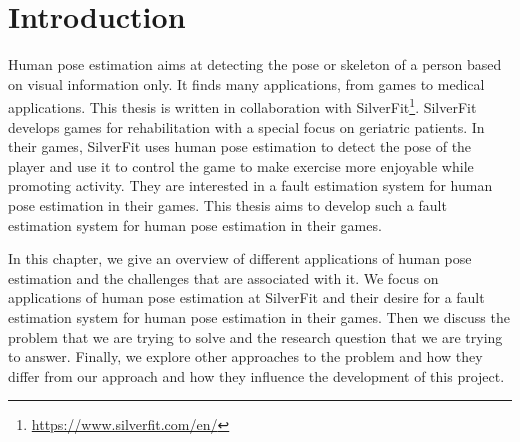 \chapter{Introduction}
\setcounter{page}{1}

Human pose estimation aims at detecting the pose or skeleton of a person based on visual information only. It finds many applications, from games to medical applications. This thesis is written in collaboration with SilverFit\footnote{\url{https://www.silverfit.com/en/}}. SilverFit develops games for rehabilitation with a special focus on geriatric patients. In their games, SilverFit uses human pose estimation to detect the pose of the player and use it to control the game to make exercise more enjoyable while promoting activity. They are interested in a fault estimation system for human pose estimation in their games. This thesis aims to develop such a fault estimation system for human pose estimation in their games.

In this chapter, we give an overview of different applications of human pose estimation and the challenges that are associated with it. We focus on applications of human pose estimation at SilverFit and their desire for a fault estimation system for human pose estimation in their games. Then we discuss the problem that we are trying to solve and the research question that we are trying to answer. Finally, we explore other approaches to the problem and how they differ from our approach and how they influence the development of this project.






